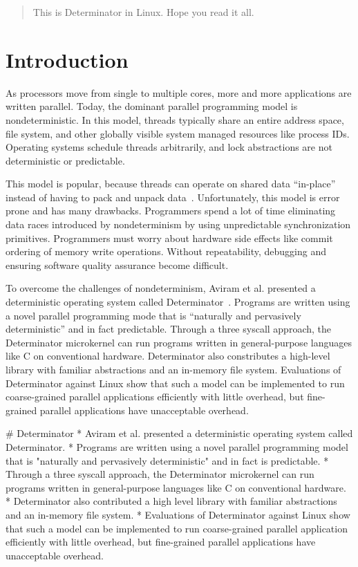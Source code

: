 
\begin{abstract}
This is Determinator in Linux. Hope you read it all.
\end{abstract}

\section{Introduction}
As processors move from single to multiple cores, more and more applications are
written parallel. Today, the dominant parallel programming model is
nondeterministic. In this model, threads typically share an entire address
space, file system, and other globally visible system managed resources like
process IDs. Operating systems schedule threads arbitrarily, and
lock abstractions are not deterministic or predictable.

This model is popular,
because threads can operate on shared data ``in-place'' instead of having to
pack and unpack data~\cite{Aviram10}. Unfortunately, this model is
error prone and has many drawbacks. Programmers spend a lot of time eliminating
data races introduced by nondeterminism by using unpredictable synchronization
primitives. Programmers must worry about hardware side effects like commit
ordering of memory write operations. Without repeatability, debugging and
ensuring software quality assurance become difficult.

To overcome the challenges of nondeterminism, Aviram et al. presented a
deterministic operating system called Determinator~\cite{Aviram10}.
Programs are written using a novel parallel programming mode that is ``naturally
and pervasively deterministic'' and in fact predictable. Through a three
syscall approach, the
Determinator microkernel can run programs written in general-purpose languages
like C on conventional hardware. Determinator also constributes a high-level
library with familiar abstractions and an in-memory file system. Evaluations
of Determinator against Linux show that such a model can be implemented to run
coarse-grained parallel applications efficiently with little overhead, but
fine-grained parallel applications have unacceptable overhead.

\iffalse

# Determinator
* Aviram et al. presented a deterministic operating system called Determinator.
* Programs are written using a novel parallel programming model that is
  "naturally and pervasively deterministic" and in fact is predictable.
* Through a three syscall approach, the Determinator microkernel can run
  programs written in general-purpose languages like C on conventional hardware.
* Determinator also contributed a high level library with familiar abstractions
  and an in-memory file system.
* Evaluations of Determinator against Linux show that such a model can be
  implemented to run coarse-grained parallel application efficiently with little
  overhead, but fine-grained parallel applications have unacceptable overhead.

